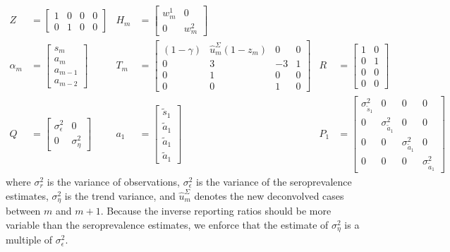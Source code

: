 \begin{align*}
    Z &= \begin{bmatrix} 1 & 0 & 0 & 0 \\ 0 & 1 & 0 & 0 \end{bmatrix} &
    H_m &= \begin{bmatrix}w^1_{m} & 0 \\ 0 & w^2_{m} \end{bmatrix} \\
    \alpha_m &= \begin{bmatrix}s_{m} \\ a_m \\ a_{m-1}\\ a_{m-2} \end{bmatrix} & 
    T_m &= \begin{bmatrix}(1 - \gamma) & \widehat{u}^\Sigma_{m} (1 - z_m) & 0 & 0\\ 
        0 & 3 & -3 & 1 \\ 0 & 1 & 0 & 0\\ 0 & 0 & 1 & 0 \end{bmatrix}  & 
    R &= \begin{bmatrix}1 & 0  \\ 0 & 1 \\ 0 & 0 \\ 0 & 0 \end{bmatrix}\\
    Q &= \begin{bmatrix} \sigma^2_\epsilon & 0  \\ 0 & \sigma^2_\eta \end{bmatrix} &
    a_1 &= \begin{bmatrix} \tilde{s}_{1}\\ \tilde{a}_1\\ \tilde{a}_1 \\ \tilde{a}_1 \end{bmatrix} & 
    P_{1} &= \begin{bmatrix} \sigma^2_{\tilde{s}_{1}} & 0 & 0 & 0 \\ 
    0 & \sigma^2_{\tilde{a}_1} & 0 & 0\\ 0 & 0 & \sigma^2_{\tilde{a}_1} & 0 \\ 
    0 & 0 & 0 & \sigma^2_{\tilde{a}_1} \end{bmatrix} 
\end{align*}
where $\sigma^2_r$ is the variance of observations, $\sigma^2_\epsilon$ is the
variance of the seroprevalence estimates, $\sigma^2_\eta$ is the trend variance,
and $\widehat{u}^\Sigma_{m}$ denotes the new deconvolved cases between $m$ and
$m+1$. Because the inverse reporting ratios should be more variable than the
seroprevalence estimates, we enforce that the estimate of $\sigma^2_\eta$ is a
multiple of $\sigma^2_\epsilon$. 

